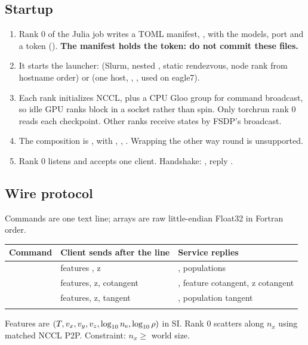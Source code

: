 \subsection{Startup}
\begin{enumerate}
\item Rank 0 of the Julia job writes a TOML manifest, , with the models, port and a token (). \textbf{The manifest holds the token: do not commit these files.}
\item It starts the launcher:  (Slurm, nested , static rendezvous, node rank from hostname order) or  (one host, , , used on eagle7).
\item Each rank initializes NCCL, plus a CPU Gloo group for command broadcast, so idle GPU ranks block in a socket rather than spin. Only torchrun rank 0 reads each checkpoint. Other ranks receive states by FSDP's  broadcast.
\item The composition is , with , , . Wrapping the other way round is unsupported.
\item Rank 0 listens and accepts one client. Handshake: , reply .
\end{enumerate}

\subsection{Wire protocol}
Commands are one text line; arrays are raw little-endian Float32 in Fortran order.
\begin{table}[H]\centering\small
\begin{tabularx}{\linewidth}{lYY}
\toprule
Command&Client sends after the line&Service replies\\\midrule
{}&features , z &, populations \\
&features, z, cotangent &, feature cotangent, z cotangent\\
&features, z, tangent &, population tangent\\
&&\\\bottomrule
\end{tabularx}
\end{table}
Features are $(T,v_x,v_y,v_z,\log_{10}n_{\rm e},\log_{10}\rho)$ in SI. Rank 0 scatters along $n_x$ using matched NCCL P2P. Constraint: $n_x\ge$ world size.


